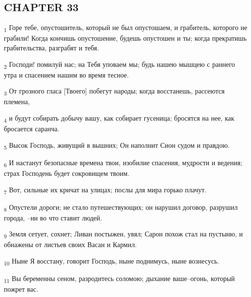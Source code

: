 \subsection{CHAPTER 33}
\begin{tcolorbox}
\textsubscript{1} Горе тебе, опустошитель, который не был опустошаем, и грабитель, которого не грабили! Когда кончишь опустошение, будешь опустошен и ты; когда прекратишь грабительства, разграбят и тебя.
\end{tcolorbox}
\begin{tcolorbox}
\textsubscript{2} Господи! помилуй нас; на Тебя уповаем мы; будь нашею мышцею с раннего утра и спасением нашим во время тесное.
\end{tcolorbox}
\begin{tcolorbox}
\textsubscript{3} От грозного гласа [Твоего] побегут народы; когда восстанешь, рассеются племена,
\end{tcolorbox}
\begin{tcolorbox}
\textsubscript{4} и будут собирать добычу вашу, как собирает гусеница; бросятся на нее, как бросается саранча.
\end{tcolorbox}
\begin{tcolorbox}
\textsubscript{5} Высок Господь, живущий в вышних; Он наполнит Сион судом и правдою.
\end{tcolorbox}
\begin{tcolorbox}
\textsubscript{6} И настанут безопасные времена твои, изобилие спасения, мудрости и ведения; страх Господень будет сокровищем твоим.
\end{tcolorbox}
\begin{tcolorbox}
\textsubscript{7} Вот, сильные их кричат на улицах; послы для мира горько плачут.
\end{tcolorbox}
\begin{tcolorbox}
\textsubscript{8} Опустели дороги; не стало путешествующих; он нарушил договор, разрушил города, --ни во что ставит людей.
\end{tcolorbox}
\begin{tcolorbox}
\textsubscript{9} Земля сетует, сохнет; Ливан постыжен, увял; Сарон похож стал на пустыню, и обнажены от листьев своих Васан и Кармил.
\end{tcolorbox}
\begin{tcolorbox}
\textsubscript{10} Ныне Я восстану, говорит Господь, ныне поднимусь, ныне вознесусь.
\end{tcolorbox}
\begin{tcolorbox}
\textsubscript{11} Вы беременны сеном, разродитесь соломою; дыхание ваше--огонь, который пожрет вас.
\end{tcolorbox}
